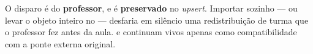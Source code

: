 \begin{regra}
O disparo é do \textbf{professor}, e  é \textbf{preservado} no
\emph{upsert}. Importar sozinho --- ou levar o objeto inteiro no  ---
desfaria em silêncio uma redistribuição de turma que o professor fez antes da
aula.  e  continuam vivos
apenas como compatibilidade com a ponte externa original.
\end{regra}
